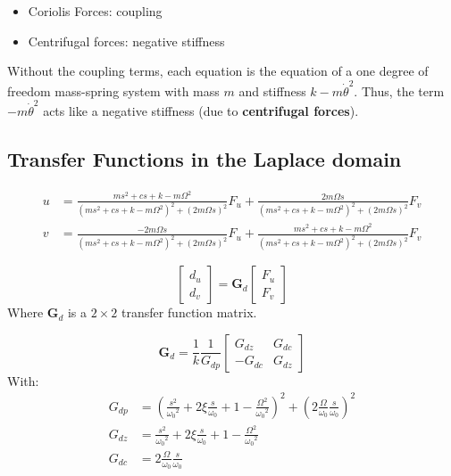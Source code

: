 \documentclass{ISMA_USD2020}
\begin{document}
\begin{itemize}
\item Coriolis Forces: coupling
\item Centrifugal forces: negative stiffness
\end{itemize}

Without the coupling terms, each equation is the equation of a one degree of freedom mass-spring system with mass \(m\) and stiffness \(k- m\dot{\theta}^2\).
Thus, the term \(- m\dot{\theta}^2\) acts like a negative stiffness (due to \textbf{centrifugal forces}).


\subsection{Transfer Functions in the Laplace domain}
\label{sec:orgfcd3def}

\begin{subequations}
  \begin{align}
    u &= \frac{ms^2 + cs + k - m \Omega^2}{\left( m s^2 + cs + k - m \Omega^2 \right)^2 + \left( 2 m \Omega s \right)^2} F_u +  \frac{2 m \Omega s}{\left( m s^2 + cs + k - m \Omega^2 \right)^2 + \left( 2 m \Omega s \right)^2} F_v \\
    v &= \frac{-2 m \Omega s}{\left( m s^2 + cs + k - m \Omega^2 \right)^2 + \left( 2 m \Omega s \right)^2} F_u +  \frac{ms^2 + cs + k - m \Omega^2}{\left( m s^2 + cs + k - m \Omega^2 \right)^2 + \left( 2 m \Omega s \right)^2} F_v
  \end{align}
\end{subequations}

\begin{equation}
\begin{bmatrix} d_u \\ d_v \end{bmatrix} =
\bm{G}_d
\begin{bmatrix} F_u \\ F_v \end{bmatrix}
\end{equation}
Where \(\bm{G}_d\) is a \(2 \times 2\) transfer function matrix.

\begin{equation}
\bm{G}_d = \frac{1}{k} \frac{1}{G_{dp}}
\begin{bmatrix}
   G_{dz} & G_{dc} \\
  -G_{dc} & G_{dz}
\end{bmatrix}
\end{equation}
With:
\begin{subequations}
  \begin{align}
    G_{dp} &= \left( \frac{s^2}{{\omega_0}^2} + 2 \xi \frac{s}{\omega_0} + 1 - \frac{{\Omega}^2}{{\omega_0}^2} \right)^2 + \left( 2 \frac{\Omega}{\omega_0} \frac{s}{\omega_0} \right)^2 \\
    G_{dz} &= \frac{s^2}{{\omega_0}^2} + 2 \xi \frac{s}{\omega_0} + 1 - \frac{{\Omega}^2}{{\omega_0}^2} \\
    G_{dc} &= 2 \frac{\Omega}{\omega_0} \frac{s}{\omega_0}
  \end{align}
\end{subequations}
\end{document}
